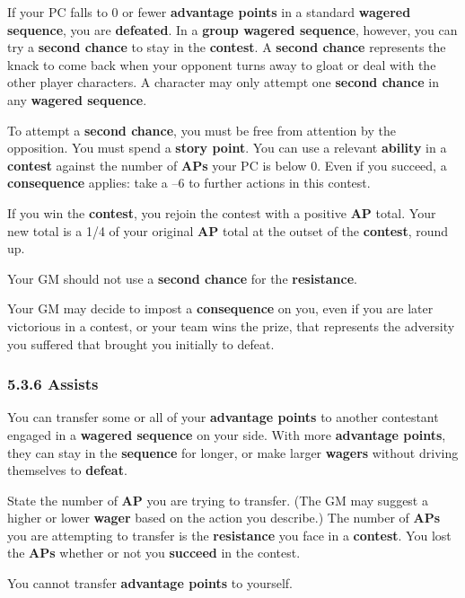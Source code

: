 \documentclass[
  11pt,
]{article}
\begin{document}
If your PC falls to 0 or fewer \textbf{advantage points} in a standard
\textbf{wagered sequence}, you are \textbf{defeated}. In a \textbf{group
wagered sequence}, however, you can try a \textbf{second chance} to stay
in the \textbf{contest}. A \textbf{second chance} represents the knack
to come back when your opponent turns away to gloat or deal with the
other player characters. A character may only attempt one \textbf{second
chance} in any \textbf{wagered sequence}.

To attempt a \textbf{second chance}, you must be free from attention by
the opposition. You must spend a \textbf{story point}. You can use a
relevant \textbf{ability} in a \textbf{contest} against the number of
\textbf{APs} your PC is below 0. Even if you succeed, a
\textbf{consequence} applies: take a --6 to further actions in this
contest.

If you win the \textbf{contest}, you rejoin the contest with a positive
\textbf{AP} total. Your new total is a 1/4 of your original \textbf{AP}
total at the outset of the \textbf{contest}, round up.

Your GM should not use a \textbf{second chance} for the
\textbf{resistance}.

Your GM may decide to impost a \textbf{consequence} on you, even if you
are later victorious in a contest, or your team wins the prize, that
represents the adversity you suffered that brought you initially to
defeat.

\hypertarget{assists-2}{%
\subsubsection{5.3.6 Assists}\label{assists-2}}

You can transfer some or all of your \textbf{advantage points} to
another contestant engaged in a \textbf{wagered sequence} on your side.
With more \textbf{advantage points}, they can stay in the
\textbf{sequence} for longer, or make larger \textbf{wagers} without
driving themselves to \textbf{defeat}.

State the number of \textbf{AP} you are trying to transfer. (The GM may
suggest a higher or lower \textbf{wager} based on the action you
describe.) The number of \textbf{APs} you are attempting to transfer is
the \textbf{resistance} you face in a \textbf{contest}. You lost the
\textbf{APs} whether or not you \textbf{succeed} in the contest.

You cannot transfer \textbf{advantage points} to yourself.
\end{document}
